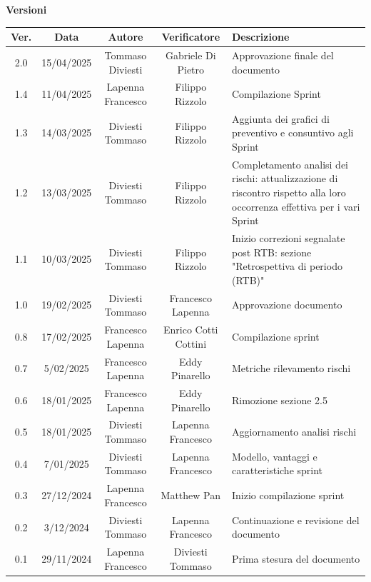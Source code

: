 \documentclass{article}
\begin{document}
\newpage
\begin{table}[h!]
\centering
\textbf{Versioni} \\ %
\vspace{2mm} %
\renewcommand{\arraystretch}{1.7}
    
\begin{tabular}{|c|c|c|c|m{}|}
    \hline
    \textbf{Ver.} & \textbf{Data} & \textbf{Autore} & \textbf{Verificatore} & \textbf{Descrizione} \\
    \hline
    2.0 & 15/04/2025 & Tommaso Diviesti & Gabriele Di Pietro & Approvazione finale del documento \\
    \hline
    1.4 & 11/04/2025 & Lapenna Francesco & Filippo Rizzolo & Compilazione Sprint \\
    \hline
    1.3 & 14/03/2025 & Diviesti Tommaso & Filippo Rizzolo & Aggiunta dei grafici di preventivo e consuntivo agli Sprint \\
    \hline
    1.2 & 13/03/2025 & Diviesti Tommaso & Filippo Rizzolo & Completamento analisi dei rischi: attualizzazione di riscontro rispetto alla loro occorrenza effettiva per i vari Sprint \\
    \hline
    1.1 & 10/03/2025 & Diviesti Tommaso & Filippo Rizzolo & Inizio correzioni segnalate post RTB: sezione "Retrospettiva di periodo (RTB)" \\
    \hline
    1.0 & 19/02/2025 & Diviesti Tommaso & Francesco Lapenna & Approvazione documento \\
    \hline
    0.8 & 17/02/2025 & Francesco Lapenna & Enrico Cotti Cottini & Compilazione sprint \\
    \hline
    0.7 & 5/02/2025 & Francesco Lapenna & Eddy Pinarello & Metriche rilevamento rischi \\
    \hline
    0.6 & 18/01/2025 & Francesco Lapenna & Eddy Pinarello & Rimozione sezione 2.5 \\
    \hline
    0.5 & 18/01/2025 & Diviesti Tommaso & Lapenna Francesco & Aggiornamento analisi rischi \\
    \hline
    0.4 & 7/01/2025 & Diviesti Tommaso & Lapenna Francesco & Modello, vantaggi e caratteristiche sprint \\
    \hline
    0.3 & 27/12/2024 & Lapenna Francesco & Matthew Pan & Inizio compilazione sprint \\
    \hline
    0.2 & 3/12/2024 & Diviesti Tommaso & Lapenna Francesco & Continuazione e revisione del documento \\
    \hline
    0.1 & 29/11/2024 & Lapenna Francesco & Diviesti Tommaso & Prima stesura del documento \\
    \hline
\end{tabular}
\end{table}
\end{document}
